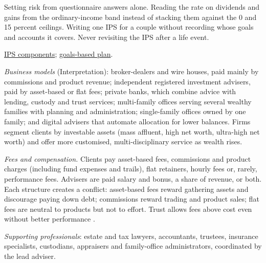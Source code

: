 \begin{qfmethod}
 Setting risk from questionnaire answers alone. Reading the rate on dividends and gains from the ordinary-income band instead of stacking them against the 0 and 15 percent ceilings. Writing one IPS for a couple without recording whose goals and accounts it covers. Never revisiting the IPS after a life event.

 \hyperref[meth:investment-policy-statement]{IPS components}; \hyperref[meth:goals-based-financial-plan]{goals-based plan}.

\end{qfmethod}

\begin{qfdefinition}\label{def:wealth-management-industry}
 \emph{Business models} (Interpretation): broker-dealers and wire houses, paid mainly by commissions and product revenue; independent registered investment advisers, paid by asset-based or flat fees; private banks, which combine advice with lending, custody and trust services; multi-family offices serving several wealthy families with planning and administration; single-family offices owned by one family; and digital advisers that automate allocation for lower balances. Firms segment clients by investable assets (mass affluent, high net worth, ultra-high net worth) and offer more customised, multi-disciplinary service as wealth rises.

\emph{Fees and compensation.} Clients pay asset-based fees, commissions and product charges (including fund expenses and trails), flat retainers, hourly fees or, rarely, performance fees. Advisers are paid salary and bonus, a share of revenue, or both. Each structure creates a conflict: asset-based fees reward gathering assets and discourage paying down debt; commissions reward trading and product sales; flat fees are neutral to products but not to effort. Trust allows fees above cost even without better performance \citep[pp.~1--5]{gennaioli-shleifer-vishny-money-doctors-2012}.

\emph{Supporting professionals}: estate and tax lawyers, accountants, trustees, insurance specialists, custodians, appraisers and family-office administrators, coordinated by the lead adviser.


\end{qfdefinition}
